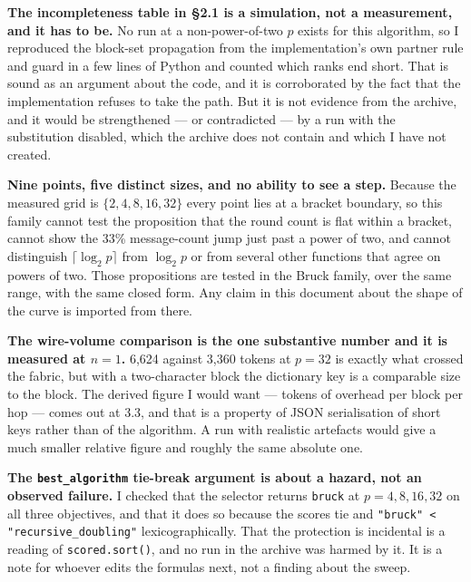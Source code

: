 \documentclass[11pt]{article}
\begin{document}
\textbf{The incompleteness table in \S2.1 is a simulation, not a measurement, and it has to be.}
No run at a non-power-of-two $p$ exists for this algorithm, so I reproduced the block-set
propagation from the implementation's own partner rule and guard in a few lines of Python and
counted which ranks end short. That is sound as an argument about the code, and it is corroborated
by the fact that the implementation refuses to take the path. But it is not evidence from the
archive, and it would be strengthened --- or contradicted --- by a run with the substitution
disabled, which the archive does not contain and which I have not created.

\textbf{Nine points, five distinct sizes, and no ability to see a step.} Because the measured grid
is $\{2,4,8,16,32\}$ every point lies at a bracket boundary, so this family cannot test the
proposition that the round count is flat within a bracket, cannot show the 33\% message-count jump
just past a power of two, and cannot distinguish $\lceil\log_2 p\rceil$ from $\log_2 p$ or from
several other functions that agree on powers of two. Those propositions are tested in the Bruck
family, over the same range, with the same closed form. Any claim in this document about the shape
of the curve is imported from there.

\textbf{The wire-volume comparison is the one substantive number and it is measured at $n=1$.}
6{,}624 against 3{,}360 tokens at $p=32$ is exactly what crossed the fabric, but with a two-character
block the dictionary key is a comparable size to the block. The derived figure I would want ---
tokens of overhead per block per hop --- comes out at 3.3, and that is a property of JSON
serialisation of short keys rather than of the algorithm. A run with realistic artefacts would give
a much smaller relative figure and roughly the same absolute one.

\textbf{The \texttt{best\_algorithm} tie-break argument is about a hazard, not an observed
failure.} I checked that the selector returns \texttt{bruck} at $p = 4, 8, 16, 32$ on all three
objectives, and that it does so because the scores tie and \texttt{"bruck" < "recursive\_doubling"}
lexicographically. That the protection is incidental is a reading of \texttt{scored.sort()}, and
no run in the archive was harmed by it. It is a note for whoever edits the formulas next, not a
finding about the sweep.
\end{document}
